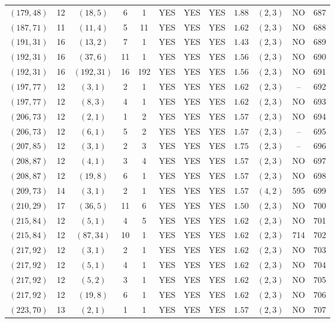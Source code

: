 \begin{longtable}{|c|c|c|c|c|c|c|c|c|c|c|c|}
$(179,48)$ & 12 & $(18,5)$ & 6 & 1 & YES & YES & YES & $1.88$ & $(2,3)$ & NO & 687\\
$(187,71)$ & 11 & $(11,4)$ & 5 & 11 & YES & YES & YES & $1.62$ & $(2,3)$ & NO & 688\\
$(191,31)$ & 16 & $(13,2)$ & 7 & 1 & YES & YES & YES & $1.43$ & $(2,3)$ & NO & 689\\
$(192,31)$ & 16 & $(37,6)$ & 11 & 1 & YES & YES & YES & $1.56$ & $(2,3)$ & NO & 690\\
$(192,31)$ & 16 & $(192,31)$ & 16 & 192 & YES & YES & YES & $1.56$ & $(2,3)$ & NO & 691\\
$(197,77)$ & 12 & $(3,1)$ & 2 & 1 & YES & YES & YES & $1.62$ & $(2,3)$ & -- & 692\\
$(197,77)$ & 12 & $(8,3)$ & 4 & 1 & YES & YES & YES & $1.62$ & $(2,3)$ & NO & 693\\
$(206,73)$ & 12 & $(2,1)$ & 1 & 2 & YES & YES & YES & $1.57$ & $(2,3)$ & NO & 694\\
$(206,73)$ & 12 & $(6,1)$ & 5 & 2 & YES & YES & YES & $1.57$ & $(2,3)$ & -- & 695\\
$(207,85)$ & 12 & $(3,1)$ & 2 & 3 & YES & YES & YES & $1.75$ & $(2,3)$ & -- & 696\\
$(208,87)$ & 12 & $(4,1)$ & 3 & 4 & YES & YES & YES & $1.57$ & $(2,3)$ & NO & 697\\
$(208,87)$ & 12 & $(19,8)$ & 6 & 1 & YES & YES & YES & $1.57$ & $(2,3)$ & NO & 698\\
$(209,73)$ & 14 & $(3,1)$ & 2 & 1 & YES & YES & YES & $1.57$ & $(4,2)$ & 595 & 699\\
$(210,29)$ & 17 & $(36,5)$ & 11 & 6 & YES & YES & YES & $1.50$ & $(2,3)$ & NO & 700\\
$(215,84)$ & 12 & $(5,1)$ & 4 & 5 & YES & YES & YES & $1.62$ & $(2,3)$ & NO & 701\\
$(215,84)$ & 12 & $(87,34)$ & 10 & 1 & YES & YES & YES & $1.62$ & $(2,3)$ & 714 & 702\\
$(217,92)$ & 12 & $(3,1)$ & 2 & 1 & YES & YES & YES & $1.62$ & $(2,3)$ & NO & 703\\
$(217,92)$ & 12 & $(5,1)$ & 4 & 1 & YES & YES & YES & $1.62$ & $(2,3)$ & NO & 704\\
$(217,92)$ & 12 & $(5,2)$ & 3 & 1 & YES & YES & YES & $1.62$ & $(2,3)$ & NO & 705\\
$(217,92)$ & 12 & $(19,8)$ & 6 & 1 & YES & YES & YES & $1.62$ & $(2,3)$ & NO & 706\\
$(223,70)$ & 13 & $(2,1)$ & 1 & 1 & YES & YES & YES & $1.57$ & $(2,3)$ & NO & 707\\

\end{longtable}
